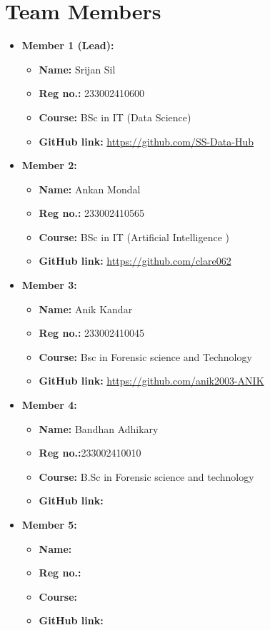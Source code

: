 \documentclass[a4paper,12pt]{article}
\begin{document}
\section*{Team Members}
\begin{itemize}
    \item \textbf{Member 1 (Lead):}
    \begin{itemize}
        \item \textbf{Name:} Srijan Sil
        \item \textbf{Reg no.:} 233002410600
        \item \textbf{Course:} BSc in IT (Data Science)
        \item \textbf{GitHub link:} \url{https://github.com/SS-Data-Hub}
    \end{itemize}
    \item \textbf{Member 2:} 
    \begin{itemize}
        \item \textbf{Name:} Ankan Mondal
        \item \textbf{Reg no.:} 233002410565
        \item \textbf{Course:} BSc in IT (Artificial Intelligence )
        \item \textbf{GitHub link:} \url{https://github.com/clare062}
    \end{itemize}
    \item \textbf{Member 3:}
    \begin{itemize}
        \item \textbf{Name:} Anik Kandar
        \item \textbf{Reg no.:} 233002410045
        \item \textbf{Course:} Bsc in Forensic science and Technology 
        \item \textbf{GitHub link:} \url{https://github.com/anik2003-ANIK}
    \end{itemize}
    \item \textbf{Member 4:}
    \begin{itemize}
        \item \textbf{Name:} Bandhan Adhikary 
        \item \textbf{Reg no.:}233002410010 
        \item \textbf{Course:} B.Sc in Forensic science and technology 
        \item \textbf{GitHub link:} \url{}
    \end{itemize}
    \item \textbf{Member 5:}
    \begin{itemize}
        \item \textbf{Name:} 
        \item \textbf{Reg no.:} 
        \item \textbf{Course:} 
        \item \textbf{GitHub link:} \url{}
    \end{itemize}
\end{itemize}
\end{document}

